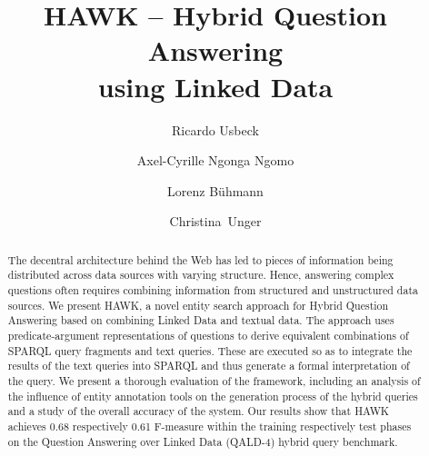 \documentclass{llncs}
\begin{document}
\title{HAWK -- Hybrid Question Answering\\ using Linked Data}
\author{
Ricardo Usbeck \and 
Axel-Cyrille Ngonga Ngomo\and 
Lorenz Bühmann \and 
Christina~Unger
}


\maketitle

\begin{abstract}
The decentral architecture behind the Web has led to pieces of information being distributed across data sources with varying structure. Hence, answering complex questions often requires combining information from structured and unstructured data sources.   
We present HAWK, a novel entity search approach for Hybrid Question Answering based on combining Linked Data and textual data.
The approach uses predicate-argument representations of questions to derive equivalent combinations of SPARQL query fragments and text queries. These are executed so as to integrate the results of the text queries into SPARQL and thus generate a formal interpretation of the query.
%
We present a thorough evaluation of the framework, including an analysis of the influence of entity annotation tools on the generation process of the hybrid queries and a study of the overall accuracy of the system. 
Our results show that HAWK achieves 0.68 respectively 0.61 F-measure within the training respectively test phases on the Question Answering over Linked Data (QALD-4) hybrid query benchmark. %
\end{abstract}
\end{document}
